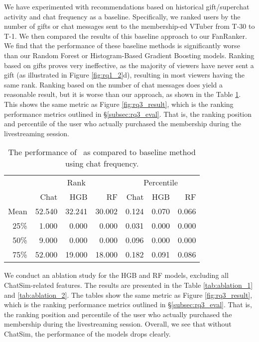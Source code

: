 We have experimented with recommendations based on historical gift/superchat activity and chat frequency as a baseline. 
Specifically, we ranked users by the number of gifts or chat messages sent to the membership-ed VTuber from T-30 to T-1. 
We then compared the results of this baseline approach to our FanRanker.
We find that the performance of these baseline methods is significantly worse than our Random Forest or Histogram-Based Gradient Boosting models. Ranking based on gifts proves very ineffective, as the majority of viewers have never sent a gift (as illustrated in Figure \ref{fig:rq1_2}d), resulting in most viewers having the same rank. Ranking based on the number of chat messages does yield a reasonable result, but it is worse than our approach, as shown in the Table \ref{tab:baseline_tab}.
This shows the same metric as Figure \ref{fig:rq3_result}, which is the ranking performance metrics outlined in \S\ref{subsec:rq3_eval}. That is, the ranking position and percentile of the user who actually purchased the membership during the livestreaming session.

\begin{table}[h]
    \centering
    
    \begin{tabular}{r|rrr|rrr}
        \hline\hline
        {} & \multicolumn{3}{c}{Rank} & \multicolumn{3}{c}{Percentile} \\
        {} & Chat  & HGB   & RF    & Chat & HGB & RF \\
        \hline
        Mean      & 52.540 & 32.241 & 30.002 & 0.124  & 0.070  & 0.066  \\
        25\%      & 1.000  & 0.000  & 0.000  & 0.031  & 0.000  & 0.000  \\
        50\%      & 9.000  & 0.000  & 0.000  & 0.096  & 0.000  & 0.000  \\
        75\%      & 52.000 & 19.000 & 18.000 & 0.182  & 0.091  & 0.086  \\
        \hline\hline
    \end{tabular}
    \caption{The performance of \toolname~as compared to baseline method using chat frequency.}
    \label{tab:baseline_tab}
\end{table}

We conduct an ablation study for the HGB and RF models, excluding all ChatSim-related features. The results are presented in the Table \ref{tab:ablation_1} and \ref{tab:ablation_2}.
The tables show the same metric as Figure \ref{fig:rq3_result}, which is the ranking performance metrics outlined in \S\ref{subsec:rq3_eval}. That is, the ranking position and percentile of the user who actually purchased the membership during the livestreaming session.
Overall, we see that without ChatSim, the performance of the models drops clearly.


